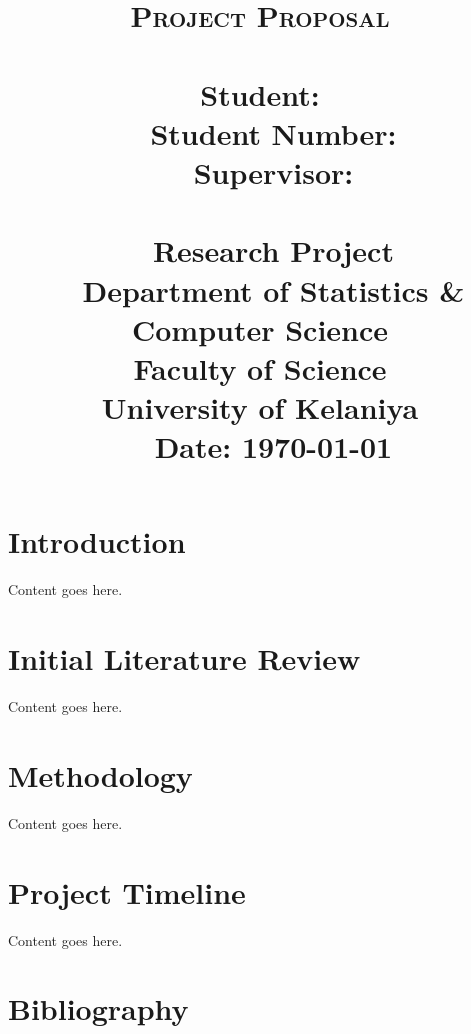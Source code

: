 \documentclass[11pt]{article}
\title{
    \thispagestyle{empty}
    \huge{\textsc{Project Proposal}\\[2\baselineskip]}
    \huge{\textbf{\provisionalTitle\\[2\baselineskip]}}
    \LARGE{\textbf{Student: } \studentName} \\ ~
    \LARGE{\textbf{Student Number: } \studentNumber } \\[3\baselineskip] ~
    \LARGE{\textbf{Supervisor: } \supervisorName} \\[5\baselineskip] ~
    \LARGE{\courseCode} \\ ~
    \LARGE{Research Project} \\[5\baselineskip] ~
    \LARGE{
        Department of Statistics \& Computer Science\\
        Faculty of Science\\
        University of Kelaniya
    } \\[1\baselineskip] ~
    \LARGE{
        Date: \today
    }
    \pagebreak
}
\author{}
\date{}
\newcommand{\sectionContentIntrodcution}{
    Content goes here.
}
\newcommand{\sectionContentInitialLiteratureReview}{
    Content goes here.
}
\newcommand{\sectionContentMethodology}{
    Content goes here.
}
\newcommand{\sectionContentProjectTimeline}{
    Content goes here.
}
\newcommand{\sectionContentBibliography}{
    \printbibliography[heading=none]
}
\begin{document}
\maketitle

\setcounter{page}{1}
\tableofcontents
\clearpage
\pagebreak

\section{Introduction}
    \sectionContentIntrodcution
\pagebreak

\section{Initial Literature Review}
    \sectionContentInitialLiteratureReview
\pagebreak

\section{Methodology}
    \sectionContentMethodology
\pagebreak

\section{Project Timeline}
    \sectionContentProjectTimeline
\pagebreak

\section{Bibliography}
    \sectionContentBibliography
\pagebreak
\end{document}
